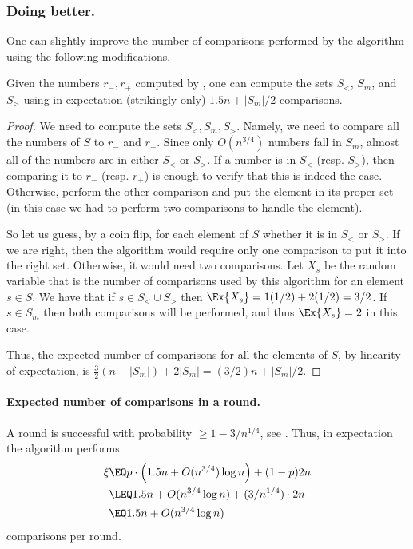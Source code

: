 \subsubsection{Doing better.}

One can slightly improve the number of comparisons performed by the
algorithm using the following modifications.
\begin{lemma}
    Given the numbers $r_{-}, r_{+}$ computed by ,
    one can compute the sets $S_<$, $S_m$, and $S_>$ using in expectation
    (strikingly only) $1.5n + |S_m|/2$ comparisons.
\end{lemma}
\begin{proof}
    We need to compute the sets $S_{<}, S_m, S_>$. Namely, we need to
    compare all the numbers of $S$ to $r_{-}$ and $r_{+}$. Since only
    $O(n^{3/4})$ numbers fall in $S_m$, almost all of the numbers are in
    either $S_<$ or $S_>$. If a number is in $S_<$ (resp. $S_>$), then
    comparing it to $r_-$ (resp. $r_+$) is enough to verify that this is
    indeed the case. Otherwise, perform the other comparison and put the
    element in its proper set (in this case we had to perform two
    comparisons to handle the element).

    So let us guess, by a coin flip, for each element of $S$ whether it
    is in $S_<$ or $S_>$. If we are right, then the algorithm would
    require only one comparison to put it into the right set. Otherwise,
    it would need two comparisons. Let $X_s$ be the random variable that
    is the number of comparisons used by this algorithm for an element
    $s \in S$. We have that if $s \in S_< \cup S_>$ then
    $\Ex{X_s} = 1(1/2) + 2(1/2) = 3/2$. If $s \in S_m$ then both
    comparisons will be performed, and thus $\Ex{X_s}=2$ in this case.

    Thus, the expected number of comparisons for all the elements of $S$,
    by linearity of expectation, is
    $\tfrac{3}{2}(n-|S_m|) + 2 |S_m| = (3/2)n + |S_m|/2$.
\end{proof}


\paragraph*{Expected number of comparisons in a round.}
A round is successful with probability
$\geq 1- 3/n^{1/4}$, see . Thus, in expectation the
algorithm performs
\begin{align*}
    \xi
    &\EQ
    p\cdot \Bigl(1.5n + O(n^{3/4}) \log n \Bigr) + (1-p)2n
    \\&
    \LEQ
    1.5n +  O(n^{3/4} \log n) + (3/n^{1/4}) \cdot 2n
    \\&
    \EQ
    1.5n + O(n^{3/4} \log n)
\end{align*}
comparisons per round. 




